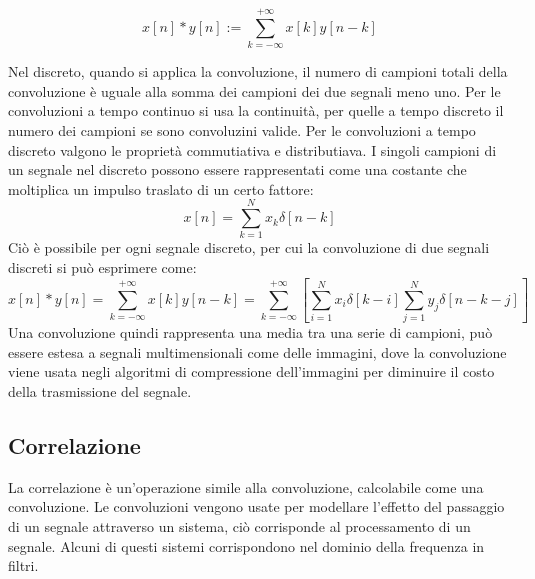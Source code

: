\documentclass{article}
\numberwithin{equation}{subsection}
\begin{document}
\begin{equation*}
    x[n]*y[n]:=\displaystyle\sum_{k=-\infty}^{+\infty}x[k]y[n-k]
\end{equation*}

Nel discreto, quando si applica la convoluzione, il numero di campioni totali della convoluzione è uguale alla somma dei campioni dei due segnali meno uno. Per le convoluzioni 
a tempo continuo si usa la continuità, per quelle a tempo discreto il numero dei campioni se sono convoluzini valide. Per le convoluzioni a tempo discreto valgono le proprietà 
commutiativa e distributiava. I singoli campioni di un segnale nel discreto possono essere rappresentati come una costante che moltiplica un impulso traslato di un certo fattore:
\begin{equation*}
    x[n]=\displaystyle\sum_{k=1}^Nx_k\delta[n-k]
\end{equation*}
Ciò è possibile per ogni segnale discreto, per cui la convoluzione di due segnali discreti si può esprimere come:
\begin{equation*}
    x[n]*y[n]=\displaystyle\sum_{k=-\infty}^{+\infty}x[k]y[n-k]=\sum_{k=-\infty}^{+\infty}\left[\sum_{i=1}^Nx_i\delta[k-i]\sum_{j=1}^Ny_j\delta[n-k-j]\right]
\end{equation*}
Una convoluzione quindi rappresenta una media tra una serie di campioni, può essere estesa a segnali multimensionali come delle immagini, dove la convoluzione viene 
usata negli algoritmi di compressione dell'immagini per diminuire il costo della trasmissione del segnale. 

\subsection{Correlazione}

La correlazione è un'operazione simile alla convoluzione, calcolabile come una convoluzione. Le convoluzioni vengono usate per modellare l'effetto del passaggio di un segnale 
attraverso un sistema, ciò corrisponde al processamento di un segnale. Alcuni di questi sistemi corrispondono nel dominio della frequenza in filtri. 
\end{document}
